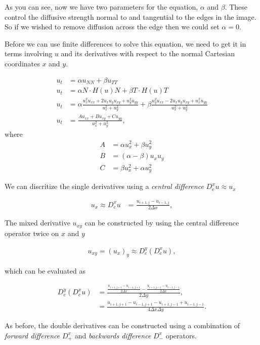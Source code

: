 \documentclass[11pt,a4paper,noindent]{article}
\begin{document}
As you can see, now we have two parameters for the equation, $\alpha$ and $\beta$. These control the diffusive strength normal to and tangential to the edges in the image. So if we wished to remove diffusion across the edge then we could set $\alpha=0$.

Before we can use finite differences to solve this equation, we need to get it in terms involving $u$ and its derivatives with respect to the normal Cartesian coordinates $x$ and $y$.

\begin{align} \label{eq:anisotropic}
u_t &= \alpha u_{NN} + \beta u_{TT} \\
u_t &= \alpha N \cdot H(u) N + \beta T \cdot H(u) T \\
u_t &= \alpha \frac{u_x^2 u_{xx} + 2 u_x u_y u_{xy} + u_y^2 u_{yy}}{u_x^2+u_y^2} + \beta \frac{u_y^2 u_{xx} - 2 u_x u_y u_{xy} + u_x^2 u_{yy}}{u_x^2+u_y^2} \\
u_t &= \frac{A u_{xx} + B u_{xy} + C u_{yy}}{u_x^2 + u_y^2},
\end{align}
where
\begin{align}
A &= \alpha u_x^2 + \beta u_y^2 \\
B &= (\alpha-\beta) u_x u_y \\
C &= \beta u_x^2 + \alpha u_y^2
\end{align}

We can discritize the single derivatives using a \emph{central difference} $D_c^x u \approx u_x$

\begin{align}
u_x \approx D_c^x u &= \frac{u_{i+1,j}-u_{i-1,j}}{2\Delta x},
\end{align}

The mixed derivative $u_{xy}$ can be constructed by using the central difference operator twice on $x$ and $y$

\begin{align}
u_{xy} = (u_x)_y \approx D_c^y (D_c^x u),
\end{align}

which can be evaluated as

\begin{align}
 D_c^y (D_c^x u) &= \frac{\frac{u_{i+1,j+1}-u_{i-1,j+1}}{2\Delta x} - \frac{u_{i+1,j-1}-u_{i-1,j-1}}{2\Delta x}}{2\Delta y}, \\
 &= \frac{u_{i+1,j+1}-u_{i-1,j+1} - u_{i+1,j-1} + u_{i-1,j-1}}{4\Delta x \Delta y}.
\end{align}

As before, the double derivatives can be constructed using a combination of \emph{forward difference} $D_+^x$ and \emph{backwards difference} $D_-^x$ operators.
\end{document}
